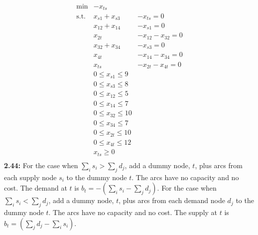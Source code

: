 \documentclass[10pt]{article}
\begin{document}
    \[
    \begin{array}{lll}
      \min & -x_{ts} &  \\
      \mbox{s.t.} & x_{s1} + x_{s3} & - x_{ts} = 0  \\
      & x_{12} + x_{14} & - x_{s1} = 0 \\
      & x_{2t} & - x_{12} - x_{32} = 0 \\
      & x_{32} + x_{34} & - x_{s3} = 0 \\
      & x_{4t} & - x_{14} - x_{34} = 0 \\
      & x_{ts} & - x_{2t} - x_{4t} = 0 \\
      & 0 \leq x_{s1} \leq 9& \\
      & 0 \leq x_{s3} \leq 8& \\
      & 0 \leq x_{12} \leq 5& \\
      & 0 \leq x_{14} \leq 7& \\
      & 0 \leq x_{32} \leq 10& \\
      & 0 \leq x_{34} \leq 7& \\
      & 0 \leq x_{2t} \leq 10& \\
      & 0 \leq x_{4t} \leq 12& \\
      & x_{ts} \geq 0& \\
    \end{array}
    \]
  \textbf{ 2.44:} For the case when $\sum_i s_i > \sum_j d_j$, add a dummy node, $t$,
    plus arcs from each supply node $s_i$ to the dummy node $t$. The
    arcs have no capacity and no cost. The demand at $t$ is $b_t =
    -(\sum_i s_i - \sum_j d_j)$.  For the case when $\sum_i s_i < \sum_j d_j$, add a dummy node, $t$, plus arcs from each demand node $d_j$ to the dummy node $t$.  The arcs have no capacity and no cost.  The supply at $t$ is $b_t = (\sum_j d_j - \sum_i s_i)$.
\end{document}
